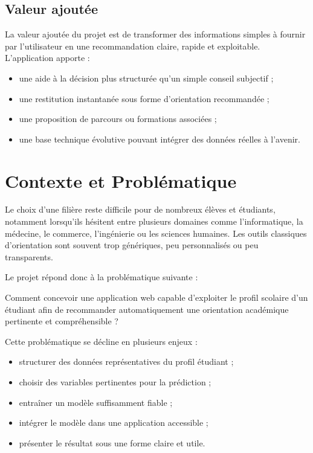 \documentclass[12pt,a4paper]{report}
\begin{document}
\section{Valeur ajoutée}
La valeur ajoutée du projet est de transformer des informations simples à fournir par l'utilisateur en une recommandation claire, rapide et exploitable. L'application apporte :
\begin{itemize}[label=--]
    \item une aide à la décision plus structurée qu'un simple conseil subjectif ;
    \item une restitution instantanée sous forme d'orientation recommandée ;
    \item une proposition de parcours ou formations associées ;
    \item une base technique évolutive pouvant intégrer des données réelles à l'avenir.
\end{itemize}

\chapter{Contexte et Problématique}

Le choix d'une filière reste difficile pour de nombreux élèves et étudiants, notamment lorsqu'ils hésitent entre plusieurs domaines comme l'informatique, la médecine, le commerce, l'ingénierie ou les sciences humaines. Les outils classiques d'orientation sont souvent trop génériques, peu personnalisés ou peu transparents.

Le projet répond donc à la problématique suivante :

\begin{mybox}
Comment concevoir une application web capable d'exploiter le profil scolaire d'un étudiant afin de recommander automatiquement une orientation académique pertinente et compréhensible ?
\end{mybox}

Cette problématique se décline en plusieurs enjeux :
\begin{itemize}[label=--]
    \item structurer des données représentatives du profil étudiant ;
    \item choisir des variables pertinentes pour la prédiction ;
    \item entraîner un modèle suffisamment fiable ;
    \item intégrer le modèle dans une application accessible ;
    \item présenter le résultat sous une forme claire et utile.
\end{itemize}
\end{document}

